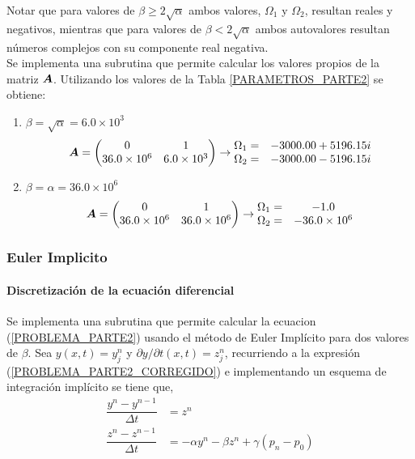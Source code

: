 Notar que para valores de $\beta \geq 2\sqrt{\alpha}$ ambos valores, $\Omega_1$ y $\Omega_2$, resultan reales y negativos, mientras que para valores de $\beta < 2\sqrt{\alpha}$ ambos autovalores resultan números complejos con su componente real negativa. \\

Se implementa una subrutina que permite calcular los valores propios de la matriz $\boldsymbol{A}$. Utilizando los valores de la Tabla \ref{PARAMETROS_PARTE2} se obtiene:
\begin{enumerate} [label=(\alph*)]
\item $\beta = \sqrt{\alpha} = 6.0 \times 10^3 $
\begin{equation}
\boldsymbol{A} = \begin{pmatrix} 0 & 1 \\ 36.0 \times 10^6 & 6.0 \times 10^3 \end{pmatrix} \rightarrow 
\begin{matrix} \Omega_1 = & -3000.00 + 5196.15 i \\ \Omega_2 = & -3000.00 - 5196.15 i \end{matrix}
\end{equation} 
\item $\beta = \alpha =  36.0 \times 10^6 $
\begin{equation}
\boldsymbol{A} = \begin{pmatrix} 0 & 1 \\ 36.0 \times 10^6 & 36.0 \times 10^6 \end{pmatrix} \rightarrow 
\begin{matrix} \Omega_1 = & -1.0 \\ \Omega_2 = & -36.0 \times 10^6 \end{matrix}
\end{equation} 
\end{enumerate}


\subsubsection{Euler Implicito} 

\paragraph{Discretización de la ecuación diferencial}
Se implementa una subrutina que permite calcular la ecuacion (\ref{PROBLEMA_PARTE2}) usando el método de Euler Implícito para dos valores de $\beta$. Sea $y(x,t) = y^n_j$ y $\partial y / \partial t (x,t) = z^n_j$, recurriendo a la expresión (\ref{PROBLEMA_PARTE2_CORREGIDO}) e implementando un esquema de integración implícito se tiene que,
\begin{align}
\dfrac{y^n - y^{n-1}}{\Delta t} &= z^n \\
\dfrac{z^n - z^{n-1}}{\Delta t} &= -\alpha y^n - \beta z^n + \gamma (p_n-p_0)
\end{align}

